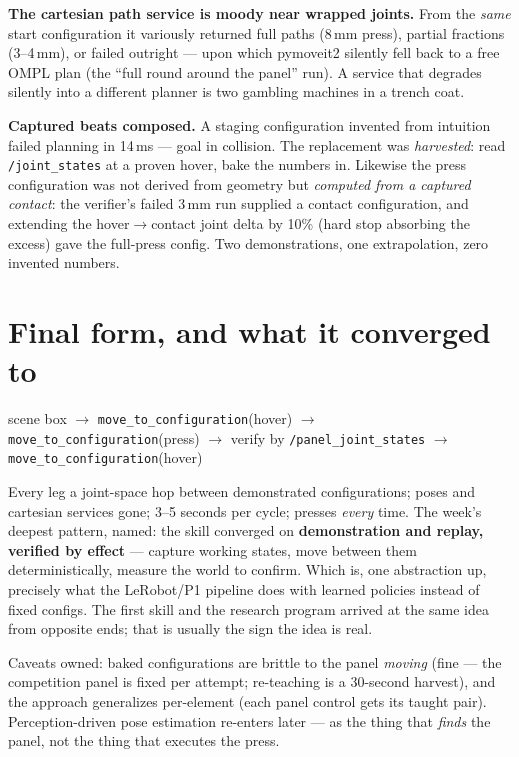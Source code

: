 \begin{lesson}
\textbf{The cartesian path service is moody near wrapped joints.} From the \emph{same} start
configuration it variously returned full paths (8\,mm press), partial fractions (3--4\,mm),
or failed outright --- upon which pymoveit2 silently fell back to a free OMPL plan (the
``full round around the panel'' run). A service that degrades silently into a different
planner is two gambling machines in a trench coat.
\end{lesson}

\begin{lesson}
\textbf{Captured beats composed.} A staging configuration invented from intuition failed
planning in 14\,ms --- goal in collision. The replacement was \emph{harvested}: read
\texttt{/joint\_states} at a proven hover, bake the numbers in. Likewise the press
configuration was not derived from geometry but \emph{computed from a captured contact}: the
verifier's failed 3\,mm run supplied a contact configuration, and extending the
hover$\to$contact joint delta by 10\% (hard stop absorbing the excess) gave the full-press
config. Two demonstrations, one extrapolation, zero invented numbers.
\end{lesson}

\section{Final form, and what it converged to}

\begin{center}
scene box $\to$ \texttt{move\_to\_configuration}(hover) $\to$
\texttt{move\_to\_configuration}(press) $\to$ verify by \texttt{/panel\_joint\_states} $\to$
\texttt{move\_to\_configuration}(hover)
\end{center}

Every leg a joint-space hop between demonstrated configurations; poses and cartesian services
gone; 3--5 seconds per cycle; presses \emph{every} time. The week's deepest pattern, named:
the skill converged on \textbf{demonstration and replay, verified by effect} --- capture
working states, move between them deterministically, measure the world to confirm. Which is,
one abstraction up, precisely what the LeRobot/P1 pipeline does with learned policies instead
of fixed configs. The first skill and the research program arrived at the same idea from
opposite ends; that is usually the sign the idea is real.

Caveats owned: baked configurations are brittle to the panel \emph{moving} (fine --- the
competition panel is fixed per attempt; re-teaching is a 30-second harvest), and the approach
generalizes per-element (each panel control gets its taught pair). Perception-driven pose
estimation re-enters later --- as the thing that \emph{finds} the panel, not the thing that
executes the press.
